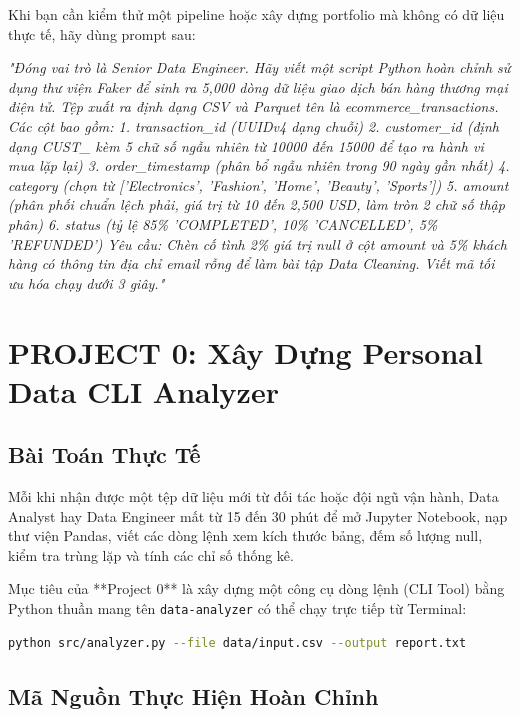 \begin{aipromptbox}
Khi bạn cần kiểm thử một pipeline hoặc xây dựng portfolio mà không có dữ liệu thực tế, hãy dùng prompt sau:

\textit{"Đóng vai trò là Senior Data Engineer. Hãy viết một script Python hoàn chỉnh sử dụng thư viện Faker để sinh ra 5,000 dòng dữ liệu giao dịch bán hàng thương mại điện tử.
Tệp xuất ra định dạng CSV và Parquet tên là ecommerce\_transactions.
Các cột bao gồm:
1. transaction\_id (UUIDv4 dạng chuỗi)
2. customer\_id (định dạng CUST\_ kèm 5 chữ số ngẫu nhiên từ 10000 đến 15000 để tạo ra hành vi mua lặp lại)
3. order\_timestamp (phân bổ ngẫu nhiên trong 90 ngày gần nhất)
4. category (chọn từ ['Electronics', 'Fashion', 'Home', 'Beauty', 'Sports'])
5. amount (phân phối chuẩn lệch phải, giá trị từ 10 đến 2,500 USD, làm tròn 2 chữ số thập phân)
6. status (tỷ lệ 85\% 'COMPLETED', 10\% 'CANCELLED', 5\% 'REFUNDED')
Yêu cầu: Chèn cố tình 2\% giá trị null ở cột amount và 5\% khách hàng có thông tin địa chỉ email rỗng để làm bài tập Data Cleaning. Viết mã tối ưu hóa chạy dưới 3 giây."}
\end{aipromptbox}

\section{PROJECT 0: Xây Dựng Personal Data CLI Analyzer}

\subsection{Bài Toán Thực Tế}
Mỗi khi nhận được một tệp dữ liệu mới từ đối tác hoặc đội ngũ vận hành, Data Analyst hay Data Engineer mất từ 15 đến 30 phút để mở Jupyter Notebook, nạp thư viện Pandas, viết các dòng lệnh xem kích thước bảng, đếm số lượng null, kiểm tra trùng lặp và tính các chỉ số thống kê. 

Mục tiêu của **Project 0** là xây dựng một công cụ dòng lệnh (CLI Tool) bằng Python thuần mang tên \texttt{data-analyzer} có thể chạy trực tiếp từ Terminal:
\begin{lstlisting}[language=bash]
python src/analyzer.py --file data/input.csv --output report.txt
\end{lstlisting}

\subsection{Mã Nguồn Thực Hiện Hoàn Chỉnh}

